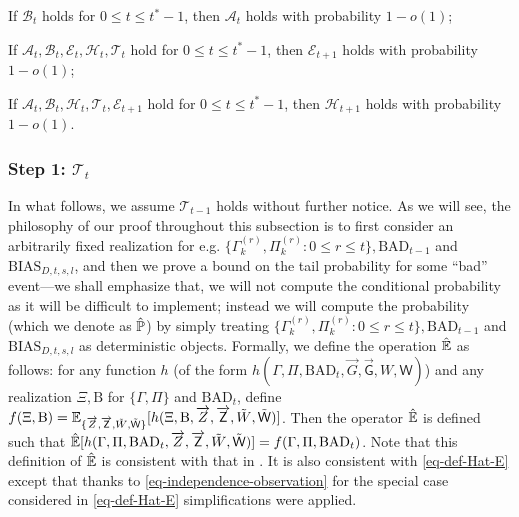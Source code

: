 \documentclass[11pt]{article}
\numberwithin{equation}{section}
\begin{document}
 If $\mathcal{B}_{t}$ holds for $0 \leq t \leq t^{*}-1$, then $\mathcal{A}_{t}$ holds with probability $1-o(1)$;
   
 If $\mathcal{A}_t, \mathcal{B}_t, \mathcal{E}_{t}, \mathcal{H}_t, \mathcal{T}_t $ hold for $0 \leq t \leq t^{*}-1$, then $\mathcal{E}_{t+1}$ holds with probability $1-o(1)$;
 
 If $\mathcal{A}_{t}, \mathcal{B}_{t}, \mathcal{H}_{t}, \mathcal{T}_t, \mathcal{E}_{t+1}$ hold for $0 \leq t \leq t^{*}-1$, then $\mathcal{H}_{t+1}$ holds with probability $1-o(1)$.






\subsubsection{Step 1: $\mathcal{T}_t$}

In what follows, we assume $\mathcal{T}_{t-1}$ holds without further notice. As we will see, the philosophy of our proof throughout this subsection is to first consider an arbitrarily fixed realization for e.g. $\{ \Gamma^{(r)}_k, \Pi^{(r)}_k : 0 \leq r \leq t \}, \mathrm{BAD}_{t-1}$ and $\mathrm{BIAS}_{D, t,s,l}$, and then we prove a bound on the tail probability for some ``bad'' event---we shall emphasize that, we will not compute the conditional probability as it will be difficult to implement; instead we will compute the probability (which we denote as $\Hat{\mathbb P}$) by simply treating $\{ \Gamma^{(r)}_k, \Pi^{(r)}_k : 0 \leq r \leq t \}, \mathrm{BAD}_{t-1}$ and $\mathrm{BIAS}_{D,t,s,l}$ as deterministic objects. Formally, we define the operation $\Hat{\mathbb{E}}$ as follows: for any function $h$ (of the form $h ( \Gamma, \Pi, \mathrm{BAD}_t, \overrightarrow{G}, \overrightarrow{\mathsf{G}}, W, \mathsf{W})$) and any realization $\Xi,\mathrm{B}$ for $\{ \Gamma, \Pi \}$ and $\mathrm{BAD}_{t}$, define  $f( \Xi,\mathrm{B} ) = \mathbb{E}_{ \{ \overrightarrow{Z}, \overrightarrow{\mathsf{Z}}, \Tilde{W}, \Tilde{\mathsf{W}} \} } [ h ( \Xi,\mathrm{B}, \overrightarrow{Z}, \overrightarrow{\mathsf{Z}}, \Tilde{W}, \Tilde{\mathsf{W}} ) ]$. Then the operator $\Hat {\mathbb E}$ is defined such that $\Hat{\mathbb{E}}[ h ( \Gamma, \Pi, \mathrm{BAD}_t, \overrightarrow{Z}, \overrightarrow{\mathsf{Z}},  \Tilde{W}, \Tilde{\mathsf{W}} ) ] = f( \Gamma, \Pi, \mathrm{BAD}_t )$. Note that this definition of $\Hat{\mathbb E}$ is consistent with that in \cite{DL22+}. It is also consistent with \eqref{eq-def-Hat-E} except that thanks to \eqref{eq-independence-observation} for the special case considered in \eqref{eq-def-Hat-E} simplifications were applied. 
\end{document}
